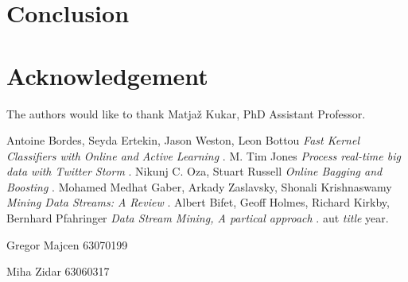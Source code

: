 \documentclass[journal]{IEEEtran/IEEEtran}
\begin{document}
\section{Conclusion}



\appendices

\section*{Acknowledgement}
The authors would like to thank Matjaž Kukar, PhD Assistant Professor.


\begin{thebibliography}{1}
 Antoine Bordes, Seyda Ertekin, Jason Weston, Leon Bottou \emph{Fast Kernel Classifiers with Online and Active Learning} .
 M. Tim Jones \emph{Process real-time big data with Twitter Storm} .
 Nikunj C. Oza, Stuart Russell \emph{Online Bagging and Boosting} \relax .
 Mohamed Medhat Gaber, Arkady Zaslavsky, Shonali Krishnaswamy \emph{Mining Data Streams: A Review} \relax .
 Albert Bifet, Geoff Holmes, Richard Kirkby, Bernhard Pfahringer \emph{Data Stream Mining, A partical approach } .
 aut \emph{title } \relax year.

\end{thebibliography}

\newpage

\begin{IEEEbiography}{Gregor Majcen}
63070199
\end{IEEEbiography}

\begin{IEEEbiography}{Miha Zidar}
63060317
\end{IEEEbiography}
\end{document}
